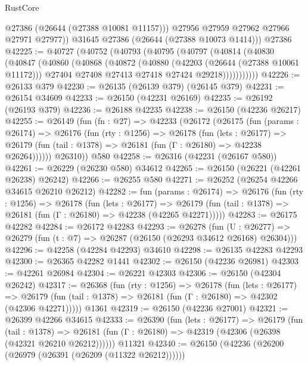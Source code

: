 \begin{lexlean}{RustCore}
\begin{coremodule}
            @27386
            (@26644 (@27388 @10081 @11157)))
          @27956
          @27959
          @27962
          @27966
          @27971
          @27977))
      @31645
      @27386
      (@26644 (@27388 @10073 @1414)))
    @27386
@42225 := @40727
    (@40752
      (@40793
        (@40795
          (@40797
            (@40814
              (@40830
                (@40847
                  (@40860
                    (@40868
                      (@40872
                        (@40880
                          (@42203 (@26644 (@27388 @10061 @11172)))
                          @27404
                          @27408
                          @27413
                          @27418
                          @27424
                          @29218)))))))))))
@42226 := @26133 @379
@42230 := @26135 (@26139 @379) (@26145 @379)
@42231 := @26154 @34609
@42233 := @26150 (@42231 @26169)
@42235 := @26192 (@26193 @379)
@42236 := @26188 @42235
@42238 := @26150 (@42236 @26217)
@42255 := @26149
    (fun (fn : @27) =>
    @42233
      (@26172
        (@26175
          (fun (params : @26174) =>
          @26176
            (fun (rty : @1256) =>
            @26178
              (fun (lets : @26177) =>
              @26179 (fun (tail : @1378) => @26181 (fun (Γ : @26180) => @42238 @26264))))))
        @26310))
    @580
@42258 := @26316 (@42231 (@26167 @580))
@42261 := @26229 (@26230 @580) @34612
@42265 := @26150 (@26221 (@42261 @26238) @26242)
@42266 := @26255 @580
@42271 := @26252 (@26254 @42266 @34615 @26210 @26212)
@42282 := fun (params : @26174) =>
  @26176
    (fun (rty : @1256) =>
    @26178
      (fun (lets : @26177) =>
      @26179 (fun (tail : @1378) => @26181 (fun (Γ : @26180) => @42238 (@42265 @42271)))))
@42283 := @26175 @42282
@42284 := @26172 @42283
@42293 := @26278
    (fun (U : @26277) => @26279 (fun (t : @7) => @26287 (@26150 (@26293 @34612 @26168) @26304)))
@42296 := @42258 (@42284 @42293) @34610
@42298 := @26135 @42283 @42293
@42300 := @26365 @42282 @1441
@42302 := @26150 (@42236 @26981)
@42303 := @42261 @26984
@42304 := @26221 @42303
@42306 := @26150 (@42304 @26242)
@42317 := @26368
    (fun (rty : @1256) =>
    @26178
      (fun (lets : @26177) =>
      @26179 (fun (tail : @1378) => @26181 (fun (Γ : @26180) => @42302 (@42306 @42271)))))
    @1361
@42319 := @26150 (@42236 @27001)
@42321 := @26399 @42266 @34615
@42333 := @26390
    (fun (lets : @26177) =>
    @26179
      (fun (tail : @1378) =>
      @26181 (fun (Γ : @26180) => @42319 (@42306 (@26398 (@42321 @26210 @26212))))))
    @11321
@42340 := @26150 (@42236 (@26200 (@26979 (@26391 (@26209 (@11322 @26212))))))

\end{coremodule}
\end{lexlean}
